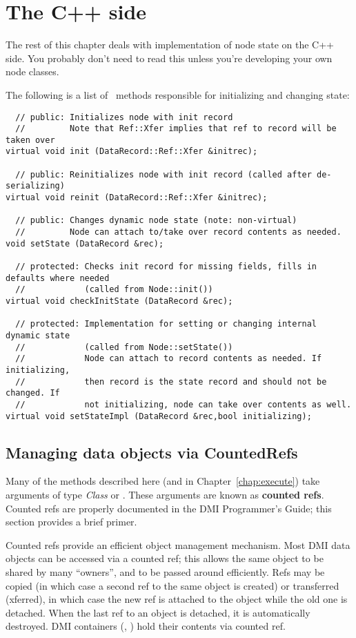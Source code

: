 \section{The C++ side}

  The rest of this chapter deals with implementation of node state on the C++
  side. You probably don't need to read this unless you're developing your own
  node classes.
  
  The following is a list of \Node\ methods responsible for initializing and
  changing state:

\begin{verbatim}
  // public: Initializes node with init record
  //         Note that Ref::Xfer implies that ref to record will be taken over
virtual void init (DataRecord::Ref::Xfer &initrec);

  // public: Reinitializes node with init record (called after de-serializing)
virtual void reinit (DataRecord::Ref::Xfer &initrec);

  // public: Changes dynamic node state (note: non-virtual)
  //         Node can attach to/take over record contents as needed.
void setState (DataRecord &rec);

  // protected: Checks init record for missing fields, fills in defaults where needed
  //            (called from Node::init())
virtual void checkInitState (DataRecord &rec);

  // protected: Implementation for setting or changing internal dynamic state 
  //            (called from Node::setState())
  //            Node can attach to record contents as needed. If initializing,
  //            then record is the state record and should not be changed. If
  //            not initializing, node can take over contents as well.
virtual void setStateImpl (DataRecord &rec,bool initializing);
\end{verbatim}

\subsection{Managing data objects via CountedRefs}
\label{sec:countedrefs}

  Many of the methods described here (and in Chapter~\ref{chap:execute})
  take arguments of type {\sl Class} or .
  These arguments are known as {\bf counted refs}. Counted refs are properly
  documented in the DMI Programmer's Guide; this section provides a brief
  primer.
  
  Counted refs provide an efficient object management mechanism. Most DMI data
  objects can be accessed via a counted ref; this allows the same object to be
  shared by many ``owners'', and to be passed around efficiently. Refs may be
  copied (in which case a second ref to the same object is created) or
  transferred (xferred), in which case the new ref is attached to the object
  while the old one is detached. When the last ref to an object is detached, it
  is automatically destroyed. DMI containers (, )
  hold their contents via counted ref. 
  
